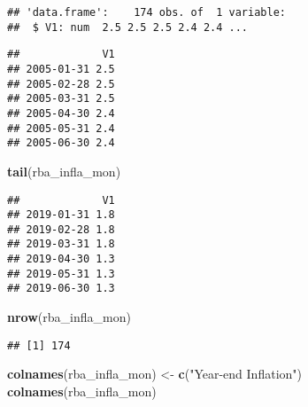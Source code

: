 \documentclass[]{article}
\newenvironment{Shaded}{\begin{snugshade}}{\end{snugshade}}
\newcommand{\KeywordTok}[1]{\textcolor[rgb]{0.13,0.29,0.53}{\textbf{#1}}}
\newcommand{\DataTypeTok}[1]{\textcolor[rgb]{0.13,0.29,0.53}{#1}}
\newcommand{\DecValTok}[1]{\textcolor[rgb]{0.00,0.00,0.81}{#1}}
\newcommand{\StringTok}[1]{\textcolor[rgb]{0.31,0.60,0.02}{#1}}
\newcommand{\OperatorTok}[1]{\textcolor[rgb]{0.81,0.36,0.00}{\textbf{#1}}}
\newcommand{\NormalTok}[1]{#1}
\begin{document}
\begin{verbatim}
## 'data.frame':    174 obs. of  1 variable:
##  $ V1: num  2.5 2.5 2.5 2.4 2.4 ...
\end{verbatim}

\begin{Shaded}
\end{Shaded}

\begin{verbatim}
##             V1
## 2005-01-31 2.5
## 2005-02-28 2.5
## 2005-03-31 2.5
## 2005-04-30 2.4
## 2005-05-31 2.4
## 2005-06-30 2.4
\end{verbatim}

\begin{Shaded}
\begin{Highlighting}[]
      \KeywordTok{tail}\NormalTok{(rba_infla_mon)}
\end{Highlighting}
\end{Shaded}

\begin{verbatim}
##             V1
## 2019-01-31 1.8
## 2019-02-28 1.8
## 2019-03-31 1.8
## 2019-04-30 1.3
## 2019-05-31 1.3
## 2019-06-30 1.3
\end{verbatim}

\begin{Shaded}
\begin{Highlighting}[]
      \KeywordTok{nrow}\NormalTok{(rba_infla_mon)}
\end{Highlighting}
\end{Shaded}

\begin{verbatim}
## [1] 174
\end{verbatim}

\begin{Shaded}
\begin{Highlighting}[]
      \KeywordTok{colnames}\NormalTok{(rba_infla_mon) <-}\StringTok{ }\KeywordTok{c}\NormalTok{(}\StringTok{"Year-end Inflation"}\NormalTok{)}
      \KeywordTok{colnames}\NormalTok{(rba_infla_mon)}
\end{Highlighting}
\end{Shaded}
\end{document}
